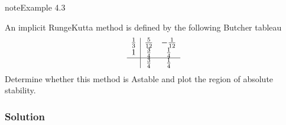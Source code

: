 \documentclass[letterpaper,10pt,english]{jupyterBook}
\begin{document}
\begin{sphinxadmonition}{note}{Example 4.3}

\sphinxAtStartPar
An implicit Runge\sphinxhyphen{}Kutta method is defined by the following Butcher tableau
\begin{align*}
    \begin{array}{c|cc}
    \frac{1}{3} & \frac{5}{12} & -\frac{1}{12} \\
    1 & \frac{3}{4} & \frac{1}{4} \\ \hline
    & \frac{3}{4} & \frac{1}{4}
    \end{array}
\end{align*}
\sphinxAtStartPar
Determine whether this method is A\sphinxhyphen{}stable and plot the region of absolute stability.
\subsubsection*{Solution}


\end{sphinxadmonition}
\end{document}
